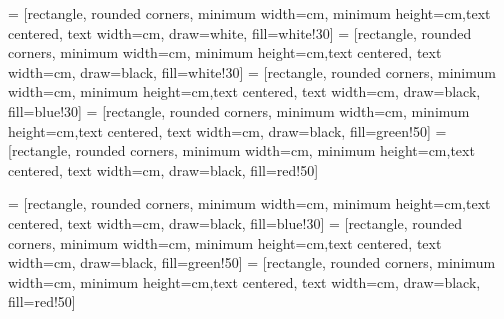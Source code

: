 \usetikzlibrary{shapes.geometric, arrows}
 = [rectangle, rounded corners, minimum width=\tikzwidth cm, minimum height=\tikzheight cm,text centered, text width=\tikzwidth cm, draw=white, fill=white!30]
 = [rectangle, rounded corners, minimum width=\tikzwidth cm, minimum height=\tikzheight cm,text centered, text width=\tikzwidth cm, draw=black, fill=white!30]
 = [rectangle, rounded corners, minimum width=\tikzwidth cm, minimum height=\tikzheight cm,text centered, text width=\tikzwidth cm, draw=black, fill=blue!30]
 = [rectangle, rounded corners, minimum width=\tikzwidth cm, minimum height=\tikzheight cm,text centered, text width=\tikzwidth cm, draw=black, fill=green!50]
 = [rectangle, rounded corners, minimum width=\tikzwidth cm, minimum height=\tikzheight cm,text centered, text width=\tikzwidth cm, draw=black, fill=red!50]

 = [rectangle, rounded corners, minimum width=\tikzwidthwide cm, minimum height=\tikzheight cm,text centered, text width=\tikzwidthwide cm, draw=black, fill=blue!30]
 = [rectangle, rounded corners, minimum width=\tikzwidthwide cm, minimum height=\tikzheight cm,text centered, text width=\tikzwidthwide cm, draw=black, fill=green!50]
 = [rectangle, rounded corners, minimum width=\tikzwidthwide cm, minimum height=\tikzheight cm,text centered, text width=\tikzwidthwide cm, draw=black, fill=red!50]


